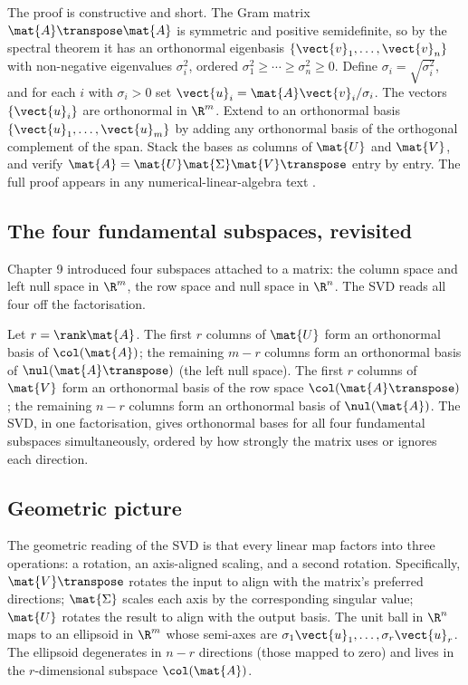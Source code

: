 The proof is constructive and short. The Gram matrix $\mat{A}\transpose
\mat{A}$ is symmetric and positive semidefinite, so by the spectral
theorem it has an orthonormal eigenbasis $\{\vect{v}_{1}, \ldots,
\vect{v}_{n}\}$ with non-negative eigenvalues $\sigma_{i}^{2}$,
ordered $\sigma_{1}^{2} \geq \cdots \geq \sigma_{n}^{2} \geq 0$.
Define $\sigma_{i} = \sqrt{\sigma_{i}^{2}}$, and for each $i$ with
$\sigma_{i} > 0$ set $\vect{u}_{i} = \mat{A} \vect{v}_{i} / \sigma_{i}$.
The vectors $\{\vect{u}_{i}\}$ are orthonormal in $\R^{m}$. Extend
to an orthonormal basis $\{\vect{u}_{1}, \ldots, \vect{u}_{m}\}$ by
adding any orthonormal basis of the orthogonal complement of the
span. Stack the bases as columns of $\mat{U}$ and $\mat{V}$, and
verify $\mat{A} = \mat{U} \mat{\Sigma} \mat{V}\transpose$ entry by
entry. The full proof appears in any numerical-linear-algebra text
\cite[ch.~4]{text:trefethen-bau1997}.

\subsection{The four fundamental subspaces, revisited}

Chapter 9 introduced four subspaces attached to a matrix: the column
space and left null space in $\R^{m}$, the row space and null space
in $\R^{n}$. The SVD reads all four off the factorisation.

Let $r = \rank \mat{A}$. The first $r$ columns of $\mat{U}$ form an
orthonormal basis of $\col(\mat{A})$; the remaining $m - r$ columns
form an orthonormal basis of $\nul(\mat{A}\transpose)$ (the left
null space). The first $r$ columns of $\mat{V}$ form an orthonormal
basis of the row space $\col(\mat{A}\transpose)$; the remaining
$n - r$ columns form an orthonormal basis of $\nul(\mat{A})$. The
SVD, in one factorisation, gives orthonormal bases for all four
fundamental subspaces simultaneously, ordered by how strongly the
matrix uses or ignores each direction.

\subsection{Geometric picture}

The geometric reading of the SVD is that every linear map factors
into three operations: a rotation, an axis-aligned scaling, and a
second rotation. Specifically, $\mat{V}\transpose$ rotates the input
to align with the matrix's preferred directions; $\mat{\Sigma}$
scales each axis by the corresponding singular value; $\mat{U}$
rotates the result to align with the output basis. The unit ball in
$\R^{n}$ maps to an ellipsoid in $\R^{m}$ whose semi-axes are
$\sigma_{1} \vect{u}_{1}, \ldots, \sigma_{r} \vect{u}_{r}$. The
ellipsoid degenerates in $n - r$ directions (those mapped to zero)
and lives in the $r$-dimensional subspace $\col(\mat{A})$.

